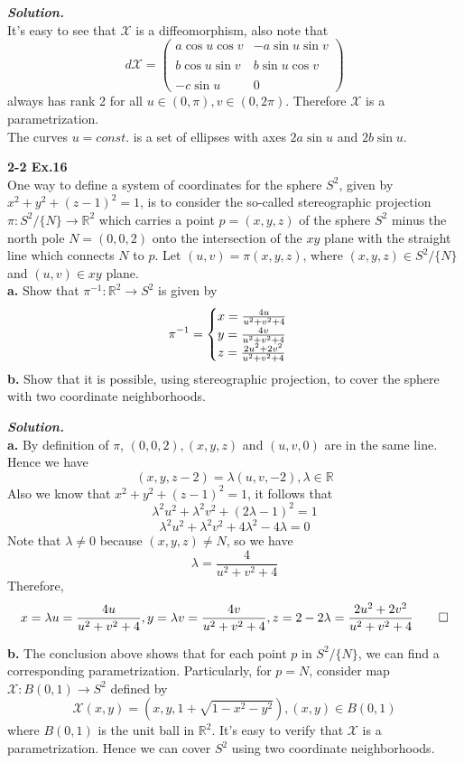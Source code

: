 \documentclass{article}
\begin{document}
\par
\textbf{\textit{Solution.}}\\
It's easy to see that $\mathcal{X}$ is a diffeomorphism, also note that
$$
    d\mathcal{X} = 
    \left(
        \begin{array}{cc}
            a \cos u \cos v & -a \sin u \sin v\\\\
            b \cos u \sin v & b \sin u \cos v\\\\
            -c \sin u & 0
        \end{array}
    \right)
$$
always has rank 2 for all $u \in (0, \pi), v \in (0, 2 \pi)$. Therefore $\mathcal{X}$ is
a parametrization.\\
The curves $u = const.$ is a set of ellipses with axes $2a \sin u$ and $2b \sin u$. \qedsymbol

\par
\textbf{2-2 Ex.16}\\
One way to define a system of coordinates for the sphere $S^2$, given by $x^2 + y^2 + (z-1)^2 = 1$,
is to consider the so-called stereographic projection $\pi: S^2 / \{N\} \to \mathbb{R}^2$ which
carries a point $p = (x,y,z)$ of the sphere $S^2$ minus the north pole $N = (0,0,2)$
onto the intersection of the $xy$ plane with the straight line which connects $N$ to $p$.
Let $(u,v) = \pi(x,y,z)$, where $(x,y,z) \in S^2 / \{N\}$ and $(u,v) \in xy$ plane.\\
\textbf{a. }Show that $\pi^{-1}: \mathbb{R}^2 \to S^2$ is given by 
$$
    \pi^{-1} = 
    \begin{cases}
        x = \frac{4u}{u^2+v^2+4}\cr
        y = \frac{4v}{u^2+v^2+4}\cr
        z = \frac{2u^2+2v^2}{u^2+v^2+4}
    \end{cases}
$$
\textbf{b. }Show that it is possible, using stereographic projection, to cover the sphere with
two coordinate neighborhoods.

\par
\textbf{\textit{Solution.}}\\
\textbf{a. }By definition of $\pi$, $(0,0,2), (x,y,z)$ and $(u,v,0)$ are in the same line. Hence we have
$$
    (x,y,z-2) = \lambda (u,v,-2), \lambda \in \mathbb{R}
$$
Also we know that $x^2 + y^2 + (z-1)^2 = 1$, it follows that
$$
    \lambda^2 u^2 + \lambda^2 v^2 + (2\lambda - 1)^2 = 1
$$
$$
    \lambda^2 u^2 + \lambda^2 v^2 + 4\lambda^2 - 4\lambda = 0
$$
Note that $\lambda \neq 0$ because $(x,y,z) \neq N$, so we have
$$
    \lambda = \frac{4}{u^2+v^2+4}
$$
Therefore,
$$
    x = \lambda u = \frac{4u}{u^2+v^2+4}, y = \lambda v = \frac{4v}{u^2+v^2+4}, z = 2-2\lambda = \frac{2u^2+2v^2}{u^2+v^2+4} \qed
$$

\textbf{b. }The conclusion above shows that for each point $p$ in $S^2 / \{N\}$, we can find
a corresponding parametrization. Particularly, for $p=N$, consider map $\mathcal{X}: B(0,1) \to S^2$ defined by
$$
    \mathcal{X}(x,y) = (x,y,1+\sqrt{1-x^2-y^2}), (x,y) \in B(0,1)
$$
where $B(0,1)$ is the unit ball in $\mathbb{R}^2$. It's easy to verify that $\mathcal{X}$ is a parametrization. Hence we can 
cover $S^2$ using two coordinate neighborhoods. \qedsymbol
\end{document}
